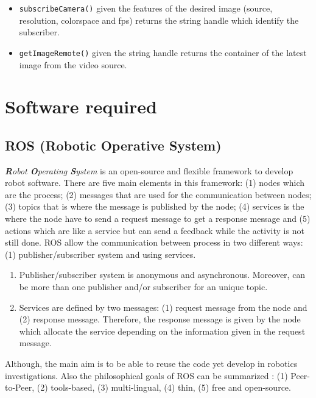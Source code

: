 \documentclass[12pt,a4paper,final,twoside,openright]{report}
\begin{document}
\begin{itemize}
\item \texttt{subscribeCamera()} given the features of the desired image (source, resolution, colorspace and fps) returns the string handle which identify the subscriber.
\item \texttt{getImageRemote()} given the string handle returns the container of the latest image from the video source.
\end{itemize}


\section{Software required}

\subsection{ROS (Robotic Operative System)}
\label{sec:ROS}

\textit{\textbf{R}obot \textbf{O}perating \textbf{S}ystem} \cite{ROS} is an open-source and flexible framework to develop robot software. There are five main elements in this framework: (1) nodes which are the process; (2) messages that are used for the communication between nodes; (3) topics that is where the message is published by the node; (4) services is the where the node have to send a request message to get a response message and (5) actions which are like a service but can send a feedback while the activity is not still done. ROS allow the communication between process in two different ways: (1) publisher/subscriber system and using services. 

\begin{enumerate}
\item Publisher/subscriber system is anonymous and asynchronous. Moreover, can be more than one publisher and/or subscriber for an unique topic.
\item Services are defined by two messages: (1) request message from the node and (2) response message. Therefore, the response message is given by the node which allocate the service depending on the information given in the request message. 
\end{enumerate}

Although, the main aim is to be able to reuse the code yet develop in robotics investigations. Also the philosophical goals of ROS can be summarized \cite{Quigley}: (1) Peer-to-Peer, (2) tools-based, (3) multi-lingual, (4) thin, (5) free and open-source. 
\end{document}
